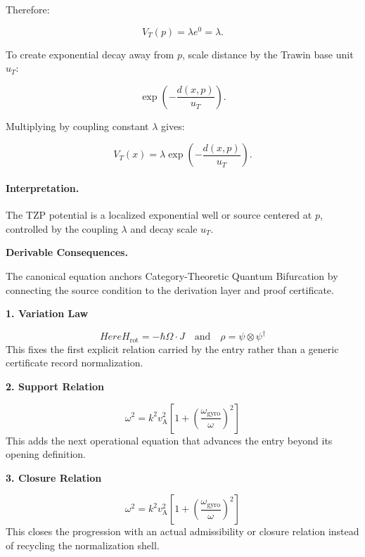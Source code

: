 Therefore:

\begin{equation}
V_T(p)=\lambda e^0=\lambda .
\end{equation}

To create exponential decay away from $p$, scale distance by the Trawin base unit $u_T$:

\begin{equation}
\exp\left(-\frac{d(x,p)}{u_T}\right).
\end{equation}

Multiplying by coupling constant $\lambda$ gives:

\begin{equation}
\boxed{
V_T(x)
=
\lambda
\exp\left(
-\frac{d(x,p)}{u_T}
\right).
}
\end{equation}

\paragraph{Interpretation.}
The TZP potential is a localized exponential well or source centered at $p$, controlled by the coupling $\lambda$ and decay scale $u_T$.

\par\vspace{0.35em}
\noindent\textbf{Derivable Consequences.}\quad
\begingroup
\footnotesize
\raggedright
The canonical equation anchors Category-Theoretic Quantum Bifurcation by connecting the source condition to the derivation layer and proof certificate.
\par\endgroup

\noindent\textbf{1. Variation Law}\par
\[
Here H_{\mathrm{rot}} = -\hbar \Omega \cdot J \quad \text{and} \quad \rho = \psi \otimes \psi^{\dagger}
\]
\noindent This fixes the first explicit relation carried by the entry rather than a generic certificate record normalization.\par
\noindent\textbf{2. Support Relation}\par
\[
\omega^{2} = k^{2} v_{\mathrm{A}}^{2}\left[1 + \left(\frac{\omega_{\mathrm{gyro}}}{\omega}\right)^{2}\right]
\]
\noindent This adds the next operational equation that advances the entry beyond its opening definition.\par
\noindent\textbf{3. Closure Relation}\par
\[
\omega^{2} = k^{2} v_{\mathrm{A}}^{2}\left[1 + \left(\frac{\omega_{\mathrm{gyro}}}{\omega}\right)^{2}\right]
\]
\noindent This closes the progression with an actual admissibility or closure relation instead of recycling the normalization shell.\par

